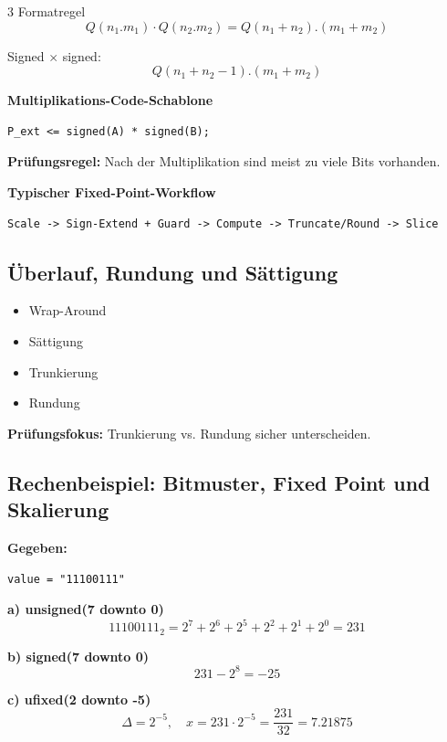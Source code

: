 \documentclass[10pt,a4paper]{article}
\newcommand{\hilite}[1]{\colorbox{yellow!25}{#1}}
\newcommand{\imp}[1]{\textbf{\textcolor{codeemph}{#1}}}
\begin{document}
\begin{multicols}{3}
\textcolor{codeemph}{Formatregel}
\[
Q(n_1.m_1) \cdot Q(n_2.m_2)
= Q(n_1+n_2).(m_1+m_2)
\]

Signed $\times$ signed:
\[
Q(n_1+n_2-1).(m_1+m_2)
\]

\textbf{Multiplikations-Code-Schablone}
\begin{lstlisting}[emph={entity,architecture,process,rising_edge,signal,constant,generic,port},
                   emphstyle=\bfseries\color{codeemph}]
P_ext <= signed(A) * signed(B);
\end{lstlisting}

\imp{Prüfungsregel:}  
Nach der Multiplikation sind \hilite{meist zu viele Bits} vorhanden.

\textbf{Typischer Fixed-Point-Workflow}
\begin{lstlisting}
Scale -> Sign-Extend + Guard -> Compute -> Truncate/Round -> Slice
\end{lstlisting}


\subsection{Überlauf, Rundung und Sättigung}

\begin{itemize}
  \item Wrap-Around
  \item Sättigung
  \item Trunkierung
  \item Rundung
\end{itemize}

\imp{Prüfungsfokus:}  
\hilite{Trunkierung vs. Rundung} sicher unterscheiden.


\subsection{Rechenbeispiel: Bitmuster, Fixed Point und Skalierung}

\textbf{Gegeben:}
\begin{lstlisting}
value = "11100111"
\end{lstlisting}

\textbf{a) unsigned(7 downto 0)}
\[
11100111_2 = 2^7+2^6+2^5+2^2+2^1+2^0 = 231
\]

\textbf{b) signed(7 downto 0)}
\[
231 - 2^8 = -25
\]

\textbf{c) ufixed(2 downto -5)}
\[
\Delta = 2^{-5}, \quad
x = 231 \cdot 2^{-5} = \frac{231}{32} = 7.21875
\]


\end{multicols}
\end{document}
